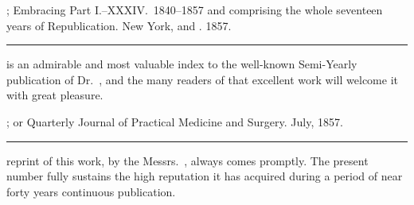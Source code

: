 \smallornament
\footnotesize
{}; Embracing Part I.--XXXIV.\ 1840--1857
and comprising the whole seventeen years of Republication. New York,  and
. 1857.
\plainbreak{1}
\normalsize

 is an admirable and most valuable index to the well-known
Semi-Yearly publication of Dr.\ , and the many readers of
that excellent work will welcome it with great pleasure.

\smallornament
\footnotesize
{}; or Quarterly Journal of Practical
Medicine and Surgery. July, 1857.
\plainbreak{1}
\normalsize

 reprint of this work, by the Messrs.\ , always comes
promptly. The present number fully sustains the high reputation it
has acquired during a period of near forty years continuous publication.
\endinput
